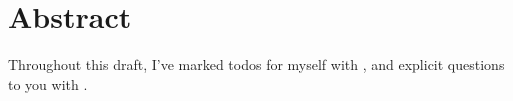 \chapter{Abstract}

Throughout this draft, I've marked todos for myself with , and explicit questions to you with .